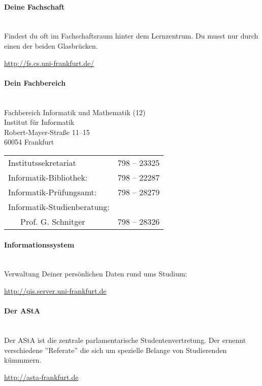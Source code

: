 \spaltenanfang
\paragraph{Deine Fachschaft}~\\
Findest du oft im Fachschaftsraum hinter dem Lernzentrum.
Du musst nur durch einen der beiden Glasbr\"ucken.\\
\begin{center}
\url{http://fs.cs.uni-frankfurt.de/}\\
\emailfachschaft
\end{center}

\paragraph{Dein Fachbereich}~\\
Fachbereich Informatik und Mathematik (12)\\
Institut für Informatik\\
Robert-Mayer-Straße 11–15\\
60054 Frankfurt\\

\begin{tabular}{ll}
Institutssekretariat & 798 – 23325 \\
Informatik-Bibliothek: & 798 – 22287\\
Informatik-Prüfungsamt: & 798 – 28279\\
Informatik-Studienberatung: & \\
~~~Prof. G. Schnitger & 798 – 28326
\end{tabular}

\paragraph{Informationssystem}~\\
Verwaltung Deiner persönlichen Daten rund ums Studium:\\
\begin{center}\url{http://qis.server.uni-frankfurt.de}\end{center}




\paragraph{Der AStA}~\\
Der AStA ist die zentrale parlamentarische Studentenvertretung.
Der ernennt verschiedene ''Referate'' die sich um spezielle Belange von Studierenden k\"ummmern.
\begin{center}\url{http://asta-frankfurt.de}\end{center}


